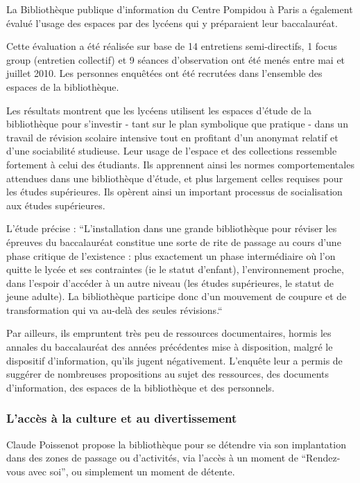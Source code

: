 \documentclass[french,a4paper,12pt]{article}
\begin{document}
\quad La Bibliothèque publique d’information du Centre Pompidou à Paris a également évalué l’usage des espaces par des lycéens qui y préparaient leur baccalauréat\citep{lyceens2010}. 

Cette évaluation a été réalisée sur base de 14 entretiens semi-directifs, 1 focus group (entretien collectif) et 9 séances d’observation ont été menés entre mai et juillet 2010. Les personnes enquêtées ont été recrutées dans l’ensemble des espaces de la bibliothèque. 

Les résultats montrent que les lycéens utilisent les espaces d’étude de la bibliothèque pour s’investir - tant sur le plan symbolique que pratique - dans un travail de révision scolaire intensive tout en profitant d’un anonymat relatif et d’une sociabilité studieuse. Leur usage de l’espace et des collections ressemble fortement à celui des étudiants. Ils apprennent ainsi les normes comportementales attendues dans une bibliothèque d’étude, et plus largement celles requises pour les études supérieures. Ils opèrent ainsi un important processus de socialisation aux études supérieures.  

L’étude précise : “L’installation dans une grande bibliothèque pour réviser les épreuves du baccalauréat constitue une sorte de rite de passage au cours d’une phase critique de l’existence : plus exactement un phase intermédiaire où l’on quitte le lycée et ses contraintes (ie le statut d’enfant), l’environnement proche, dans l’espoir d’accéder à un autre niveau (les études supérieures, le statut de jeune adulte). La bibliothèque participe donc d’un mouvement de coupure et de transformation qui va au-delà des seules révisions.“ 

Par ailleurs, ils empruntent très peu de ressources documentaires, hormis les annales du baccalauréat des années précédentes mise à disposition, malgré le dispositif d’information, qu’ils jugent négativement. L'enquête leur a permis de suggérer de nombreuses propositions au sujet des ressources, des documents d’information, des espaces de la bibliothèque et des personnels. 

\subsubsection{L’accès à la culture et au divertissement}

\quad Claude Poissenot  propose la bibliothèque pour se détendre via son implantation dans des zones de passage ou d’activités, via l’accès à un moment de “Rendez-vous avec soi”, ou simplement un moment de détente. 
\end{document}
